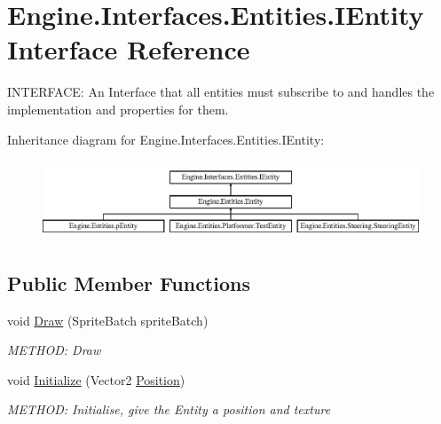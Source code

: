 \hypertarget{a00438}{}\section{Engine.\+Interfaces.\+Entities.\+I\+Entity Interface Reference}
\label{a00438}


I\+N\+T\+E\+R\+F\+A\+CE\+: An Interface that all entities must subscribe to and handles the implementation and properties for them.  


Inheritance diagram for Engine.\+Interfaces.\+Entities.\+I\+Entity\+:\begin{figure}[H]
\begin{center}
\leavevmode
\includegraphics[height=2.372881cm]{dd/dfd/a00438}
\end{center}
\end{figure}
\subsection*{Public Member Functions}
\begin{DoxyCompactItemize}
\item 
void \hyperlink{a00438_a845918af6647460d2c47a3853a30f95f}{Draw} (Sprite\+Batch sprite\+Batch)
\begin{DoxyCompactList}\small\item\em M\+E\+T\+H\+OD\+: Draw \end{DoxyCompactList}\item 
void \hyperlink{a00438_a0c80525509aaeaa0d78eef908f7f7553}{Initialize} (Vector2 \hyperlink{a00438_a33bef4197ad7b1bf344ca31f0c1bed5b}{Position})
\begin{DoxyCompactList}\small\item\em M\+E\+T\+H\+OD\+: Initialise, give the Entity a position and texture \end{DoxyCompactList}\end{DoxyCompactItemize}
